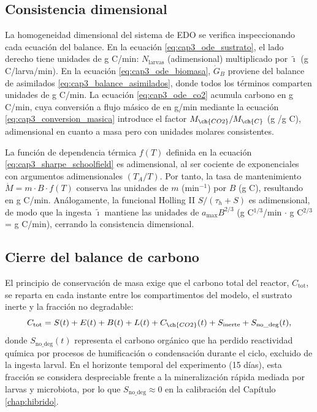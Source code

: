 \subsection{Consistencia dimensional}
\label{subsec:cap3_dimensional}

La homogeneidad dimensional del sistema de EDO se verifica inspeccionando cada ecuación del balance. En la ecuación \eqref{eq:cap3_ode_sustrato}, el lado derecho tiene unidades de g C/min: $N_{\mathrm{larvas}}$ (adimensional) multiplicado por $\tilde{\imath}$ (g C/larva/min). En la ecuación \eqref{eq:cap3_ode_biomasa}, $\dot{G}_B$ proviene del balance de asimilados \eqref{eq:cap3_balance_asimilados}, donde todos los términos comparten unidades de g C/min. La ecuación \eqref{eq:cap3_ode_co2} acumula carbono en g C/min, cuya conversión a flujo másico de  en g/min mediante la ecuación \eqref{eq:cap3_conversion_masica} introduce el factor $M_{\ch{CO2}}/M_{\ch{C}}$ (g /g C), adimensional en cuanto a masa pero con unidades molares consistentes.

La función de dependencia térmica $f(T)$ definida en la ecuación \eqref{eq:cap3_sharpe_schoolfield} es adimensional, al ser cociente de exponenciales con argumentos adimensionales $(T_A/T)$. Por tanto, la tasa de mantenimiento $\dot{M} = m \cdot B \cdot f(T)$ conserva las unidades de $m$ (min$^{-1}$) por $B$ (g C), resultando en g C/min. Análogamente, la funcional Holling II $S/(\tau_h + S)$ es adimensional, de modo que la ingesta $\tilde{\imath}$ mantiene las unidades de $a_{\max} B^{2/3}$ (g C$^{1/3}$/min $\cdot$ g C$^{2/3}$ = g C/min), cerrando la consistencia dimensional.

\subsection{Cierre del balance de carbono}
\label{subsec:cap3_balance_carbono}

El principio de conservación de masa exige que el carbono total del reactor, $C_{\mathrm{tot}}$, se reparta en cada instante entre los compartimentos del modelo, el sustrato inerte y la fracción no degradable:
\begin{equation}
    C_{\mathrm{tot}} = S(t) + E(t) + B(t) + L(t) + C_{\ch{CO2}}(t) + S_{\mathrm{inerte}} + S_{\mathrm{no\_deg}}(t),
    \label{eq:cap3_balance_global}
\end{equation}
donde $S_{\mathrm{no\_deg}}(t)$ representa el carbono orgánico que ha perdido reactividad química por procesos de humificación o condensación durante el ciclo, excluido de la ingesta larval. En el horizonte temporal del experimento (15 días), esta fracción se considera despreciable frente a la mineralización rápida mediada por larvas y microbiota, por lo que $S_{\mathrm{no\_deg}} \approx 0$ en la calibración del Capítulo \ref{chap:hibrido}.

